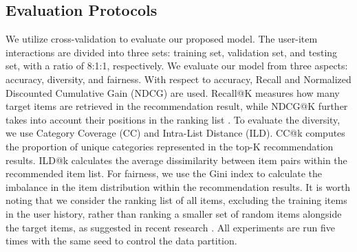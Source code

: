 \subsection{Evaluation Protocols}
We utilize cross-validation to evaluate our proposed model. The user-item interactions are divided into three sets: training set, validation set, and testing set, with a ratio of 8:1:1, respectively. We evaluate our model from three aspects: accuracy, diversity, and fairness. With respect to accuracy, Recall and Normalized Discounted Cumulative Gain (NDCG) are used. Recall@K measures how many target items are retrieved in the recommendation result, while NDCG@K further takes into account their positions in the ranking list \cite{jarvelin2002cumulated}. To evaluate the diversity, we use Category Coverage (CC) and Intra-List Distance (ILD). CC@k computes the proportion of unique categories represented in the top-K recommendation results. ILD@k calculates the average dissimilarity between item pairs within the recommended item list. For fairness, we use the Gini index to calculate the imbalance in the item distribution within the recommendation results. It is worth noting that we consider the ranking list of all items, excluding the training items in the user history, rather than ranking a smaller set of random items alongside the target items, as suggested in recent research \cite{li2020sampling}. All experiments are run five times with the same seed to control the data partition.

